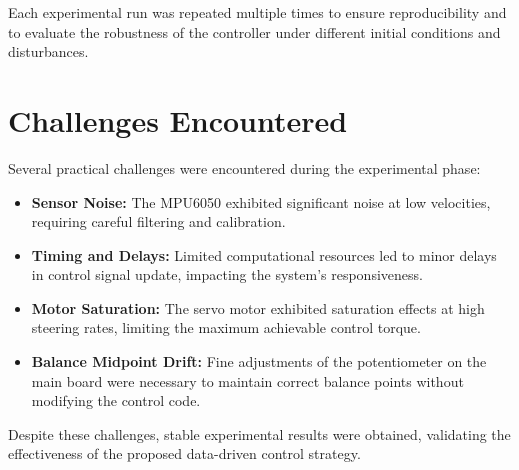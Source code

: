 Each experimental run was repeated multiple times to ensure reproducibility and to evaluate the robustness of the controller under different initial conditions and disturbances.

\section{Challenges Encountered}

Several practical challenges were encountered during the experimental phase:
\begin{itemize}
	\item \textbf{Sensor Noise:} The MPU6050 exhibited significant noise at low velocities, requiring careful filtering and calibration.
	\item \textbf{Timing and Delays:} Limited computational resources led to minor delays in control signal update, impacting the system's responsiveness.
	\item \textbf{Motor Saturation:} The servo motor exhibited saturation effects at high steering rates, limiting the maximum achievable control torque.
	\item \textbf{Balance Midpoint Drift:} Fine adjustments of the potentiometer on the main board were necessary to maintain correct balance points without modifying the control code.
\end{itemize}

Despite these challenges, stable experimental results were obtained, validating the effectiveness of the proposed data-driven control strategy.
